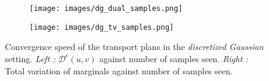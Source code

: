 \documentclass[a4paper,11pt]{article}
\newcommand{\1}{\mathbbm{1}}
\begin{document}
\begin{figure}[H]
    \centering
    \begin{subfigure}{0.48\linewidth}
        \centering
        \texttt{[image: images/dg\_dual\_samples.png]}
    \end{subfigure}%
    \hfill
    \begin{subfigure}{0.48\linewidth}
        \centering
        \texttt{[image: images/dg\_tv\_samples.png]}
    \end{subfigure}
    \caption{Convergence speed of the transport plans in the \emph{discretized Gaussian} setting. \emph{Left :} $\mathcal{D}^{\epsilon}(u, v)$ against number of samples seen. \emph{Right :} Total variation of marginals against number of samples seen.}
    \label{fig:exp3_dg1_n}
\end{figure}
\end{document}
